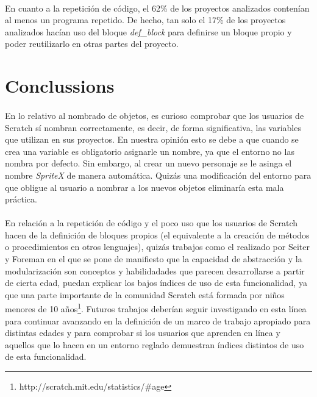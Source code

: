 \documentclass[a4paper,10pt]{article}
\begin{document}
\paragraph{}En cuanto a la repetición de código, el 62\% de los proyectos analizados contenían al menos un programa repetido. De hecho, tan solo el 17\% de los proyectos analizados hacían uso del bloque \textit{def\_block} para definirse un bloque propio y poder reutilizarlo en otras partes del proyecto.

\section{Conclussions}

\paragraph{} En lo relativo al nombrado de objetos, es curioso comprobar que los usuarios de Scratch sí nombran correctamente, es decir, de forma significativa, las variables que utilizan en sus proyectos. En nuestra opinión esto se debe a que cuando se crea una variable es obligatorio asignarle un nombre, ya que el entorno no las nombra por defecto. Sin embargo, al crear un nuevo personaje se le asinga el nombre \textit{SpriteX} de manera automática. Quizás una modificación del entorno para que obligue al usuario a nombrar a los nuevos objetos eliminaría esta mala práctica.
\paragraph{} En relación a la repetición de código y el poco uso que los usuarios de Scratch hacen de la definición de bloques propios (el equivalente a la creación de métodos o procedimientos en otros lenguajes), quizás trabajos como el realizado por Seiter y Foreman \cite{seiter2013modeling} en el que se pone de manifiesto que la capacidad de abstracción y la modularización son conceptos y habilidadades que parecen desarrollarse a partir de cierta edad, puedan explicar los bajos índices de uso de esta funcionalidad, ya que una parte importante de la comunidad Scratch está formada por niños menores de 10 años\footnote{http://scratch.mit.edu/statistics/\#age}. Futuros trabajos deberían seguir investigando en esta línea para continuar avanzando en la definición de un marco de trabajo apropiado para distintas edades y para comprobar si los usuarios que aprenden en línea y aquellos que lo hacen en un entorno reglado demuestran índices distintos de uso de esta funcionalidad. 

\newpage


\end{document}
